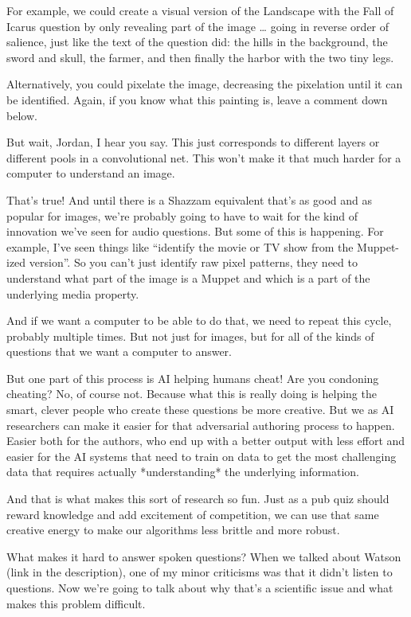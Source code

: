 For example, we could create a visual version of the Landscape with the Fall of Icarus question by only revealing part of the image … going in reverse order of salience, just like the text of the question did: the hills in the background, the sword and skull, the farmer, and then finally the harbor with the two tiny legs.  

Alternatively, you could pixelate the image, decreasing the pixelation until it can be identified.  Again, if you know what this painting is, leave a comment down below.

But wait, Jordan, I hear you say.  This just  corresponds to different layers or different pools in a convolutional net.  This won’t make it that much harder for a computer to understand an image.  

That’s true!  And until there is a Shazzam equivalent that’s as good and as popular for images, we’re probably going to have to wait for the kind of innovation we’ve seen for audio questions.  But some of this is happening.  For example, I’ve seen things like “identify the movie or TV show from the Muppet-ized version”.  So you can’t just identify raw pixel patterns, they need to understand what part of the image is a Muppet and which is a part of the underlying media property.  

And if we want a computer to be able to do that, we need to repeat this cycle, probably multiple times.  But not just for images, but for all of the kinds of questions that we want a computer to answer.  

But one part of this process is AI helping humans cheat!  Are you condoning cheating?  No, of course not.  Because what this is really doing is helping the smart, clever people who create these questions be more creative.  But we as AI researchers can make it easier for that adversarial authoring process to happen.  Easier both for the authors, who end up with a better output with less effort and easier for the AI systems that need to train on data to get the most challenging data that requires actually *understanding* the underlying information.

And that is what makes this sort of research so fun.  Just as a pub quiz should reward knowledge and add excitement of competition, we can use that same creative energy to make our algorithms less brittle and more robust.  

What makes it hard to answer spoken questions?  
When we talked about Watson (link in the description), one of my minor criticisms was that it didn’t listen to questions.  Now we’re going to talk about why that’s a scientific issue and what makes this problem difficult.

